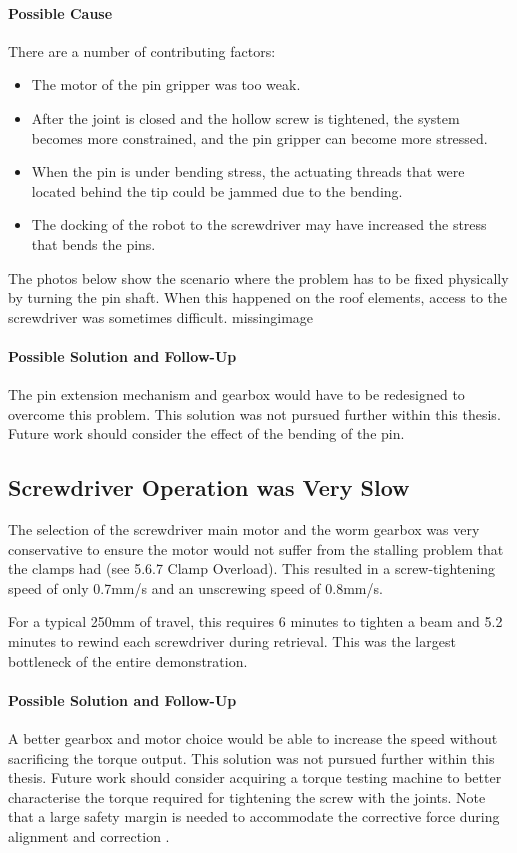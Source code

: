 \paragraph{Possible Cause}
There are a number of contributing factors:
\begin{itemize}
    \item The motor of the pin gripper was too weak.
    \item After the joint is closed and the hollow screw is tightened, the system becomes more constrained, and the pin gripper can become more stressed.
    \item When the pin is under bending stress, the actuating threads that were located behind the tip could be jammed due to the bending.
    \item The docking of the robot to the screwdriver may have increased the stress that bends the pins.
\end{itemize}
The photos below show the scenario where the problem has to be fixed physically by turning the pin shaft. When this happened on the roof elements, access to the screwdriver was sometimes difficult.
missingimage

\paragraph{Possible Solution and Follow-Up}
The pin extension mechanism and gearbox would have to be redesigned to overcome this problem. This solution was not pursued further within this thesis. Future work should consider the effect of the bending of the pin.

\subsection{Screwdriver Operation was Very Slow}
\label{subsection:exploration_4_screwdriver_operation_was_very_slow}

The selection of the screwdriver main motor and the worm gearbox was very conservative to ensure the motor would not suffer from the stalling problem that the clamps had (see 5.6.7 Clamp Overload). This resulted in a screw-tightening speed of only 0.7mm/s and an unscrewing speed of 0.8mm/s. 

For a typical 250mm of travel, this requires 6 minutes to tighten a beam and 5.2 minutes to rewind each screwdriver during retrieval. This was the largest bottleneck of the entire demonstration.

\paragraph{Possible Solution and Follow-Up}
A better gearbox and motor choice would be able to increase the speed without sacrificing the torque output. This solution was not pursued further within this thesis. Future work should consider acquiring a torque testing machine to better characterise the torque required for tightening the screw with the joints. Note that a large safety margin is needed to accommodate the corrective force during alignment and correction . 

